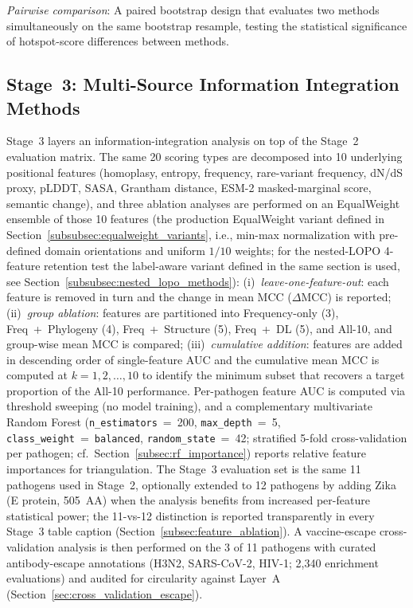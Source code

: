 \textit{Pairwise comparison}: A paired bootstrap design that evaluates two methods simultaneously on the same bootstrap resample, testing the statistical significance of hotspot-score differences between methods.

\subsection{Stage~3: Multi-Source Information Integration Methods}
\label{subsec:stage3_methods}

Stage~3 layers an information-integration analysis on top of the Stage~2 evaluation matrix. The same 20 scoring types are decomposed into 10 underlying positional features (homoplasy, entropy, frequency, rare-variant frequency, dN/dS proxy, pLDDT, SASA, Grantham distance, ESM-2 masked-marginal score, semantic change), and three ablation analyses are performed on an EqualWeight ensemble of those 10 features (the production EqualWeight variant defined in Section~\ref{subsubsec:equalweight_variants}, i.e., min-max normalization with pre-defined domain orientations and uniform $1/10$ weights; for the nested-LOPO 4-feature retention test the label-aware variant defined in the same section is used, see Section~\ref{subsubsec:nested_lopo_methods}):
(i)~\emph{leave-one-feature-out}: each feature is removed in turn and the change in mean MCC ($\Delta$MCC) is reported;
(ii)~\emph{group ablation}: features are partitioned into Frequency-only (3), Freq~+~Phylogeny (4), Freq~+~Structure (5), Freq~+~DL (5), and All-10, and group-wise mean MCC is compared;
(iii)~\emph{cumulative addition}: features are added in descending order of single-feature AUC and the cumulative mean MCC is computed at $k = 1, 2, \ldots, 10$ to identify the minimum subset that recovers a target proportion of the All-10 performance.
Per-pathogen feature AUC is computed via threshold sweeping (no model training), and a complementary multivariate Random Forest (\texttt{n\_estimators}~=~200, \texttt{max\_depth}~=~5, \texttt{class\_weight}~=~\texttt{balanced}, \texttt{random\_state}~=~42; stratified 5-fold cross-validation per pathogen; cf.\ Section~\ref{subsec:rf_importance}) reports relative feature importances for triangulation.
The Stage~3 evaluation set is the same 11 pathogens used in Stage~2, optionally extended to 12 pathogens by adding Zika (E protein, 505~AA) when the analysis benefits from increased per-feature statistical power; the 11-vs-12 distinction is reported transparently in every Stage~3 table caption (Section~\ref{subsec:feature_ablation}).
A vaccine-escape cross-validation analysis is then performed on the 3 of 11 pathogens with curated antibody-escape annotations (H3N2, SARS-CoV-2, HIV-1; 2{,}340 enrichment evaluations) and audited for circularity against Layer~A (Section~\ref{sec:cross_validation_escape}).

